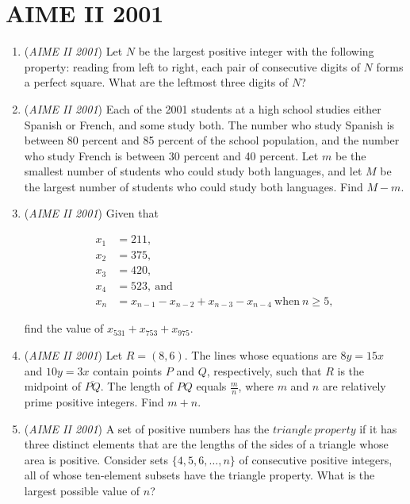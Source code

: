 \section{AIME II 2001}
        \begin{enumerate}
        	\item (\textit{AIME II 2001}) Let $N$ be the largest positive integer with the following property: reading from left to right, each pair of consecutive digits of $N$ forms a perfect square. What are the leftmost three digits of $N$?


 

	\item (\textit{AIME II 2001}) Each of the 2001 students at a high school studies either Spanish or French, and some study both. The number who study Spanish is between 80 percent and 85 percent of the school population, and the number who study French is between 30 percent and 40 percent. Let $m$ be the smallest number of students who could study both languages, and let $M$ be the largest number of students who could study both languages. Find $M-m$. 


 

	\item (\textit{AIME II 2001}) Given that

 \begin{align*}x_{1}&=211,\\ x_{2}&=375,\\ x_{3}&=420,\\ x_{4}&=523,\ \text{and}\\ x_{n}&=x_{n-1}-x_{n-2}+x_{n-3}-x_{n-4}\ \text{when}\ n\geq5, \end{align*}

find the value of $x_{531}+x_{753}+x_{975}$.


 

	\item (\textit{AIME II 2001}) Let $R = (8,6)$. The lines whose equations are $8y = 15x$ and $10y = 3x$ contain points $P$ and $Q$, respectively, such that $R$ is the midpoint of $\overline{PQ}$. The length of $PQ$ equals $\frac {m}{n}$, where $m$ and $n$ are relatively prime positive integers. Find $m + n$.


 

	\item (\textit{AIME II 2001}) A set of positive numbers has the $triangle~property$ if it has three distinct elements that are the lengths of the sides of a triangle whose area is positive. Consider sets $\{4, 5, 6, \ldots, n\}$ of consecutive positive integers, all of whose ten-element subsets have the triangle property. What is the largest possible value of $n$?



\end{enumerate}
